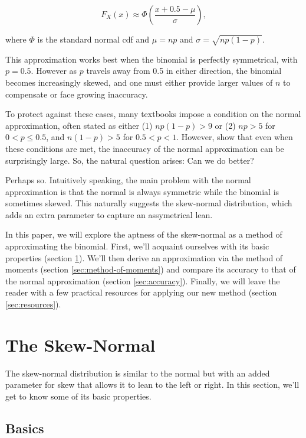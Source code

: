 \documentclass{article}
\begin{document}
\begin{equation}
  F_X(x) \approx \Phi \left( \frac{x + 0.5 - \mu}{\sigma} \right),
\end{equation}

where $\Phi$ is the standard normal cdf and $\mu = np$ and $\sigma =
\sqrt{np(1-p)}$.

This approximation works best when the binomial is perfectly symmetrical, with
$p=0.5$. However as $p$ travels away from 0.5 in either direction, the binomial
becomes increasingly skewed, and one must either provide larger values of $n$
to compensate or face growing inaccuracy.

To protect against these cases, many textbooks impose a condition on the normal
approximation, often stated as either (1) $np(1-p) > 9$ \; or \; (2) $np > 5$
for $0 < p \leq 0.5$, and $n(1-p) > 5$ for $0.5 < p < 1$. However, \citet{mabs}
show that even when these conditions are met, the inaccuracy of the normal
approximation can be surprisingly large. So, the natural question arises: Can
we do better?

Perhaps so. Intuitively speaking, the main problem with the normal
approximation is that the normal is always symmetric while the binomial is
sometimes skewed. This naturally suggests the skew-normal distribution, which
adds an extra parameter to capture an assymetrical lean.

In this paper, we will explore the aptness of the skew-normal as a method of
approximating the binomial. First, we'll acquaint ourselves with its basic
properties (section \ref{sec:properties}). We'll then derive an approximation
via the method of moments (section \ref{sec:method-of-moments}) and compare its
accuracy to that of the normal approximation (section \ref{sec:accuracy}).
Finally, we will leave the reader with a few practical resources for applying
our new method (section \ref{sec:resources}).

\section{The Skew-Normal}
\label{sec:properties}

The skew-normal distribution is similar to the normal but with an added
parameter for skew that allows it to lean to the left or right. In this
section, we'll get to know some of its basic properties.

\subsection{Basics}
\end{document}
